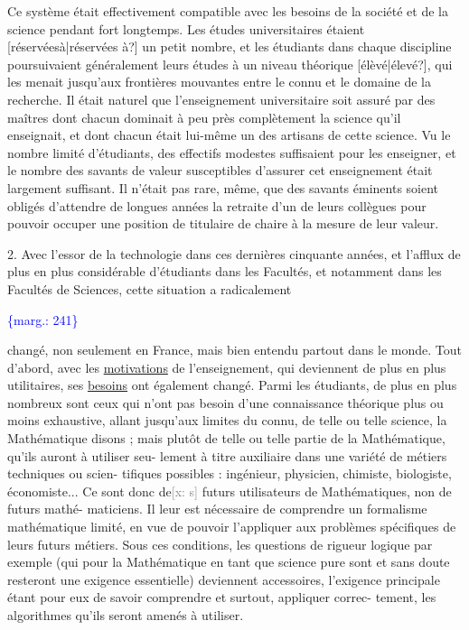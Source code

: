 \documentclass[11pt]{article}
\newcommand{\scanpage}[1]{\par\bigskip\noindent{\small\sffamily[scan #1]}\par}
\newcommand{\mspage}[1]{{\small\sffamily[p.\,#1]}}
\newcommand{\margin}[1]{\textcolor{blue}{\{\textsf{marg.:} #1\}}}
\newcommand{\xout}[1]{\textcolor{gray}{[\textsf{x:} #1]}}
\newcommand{\uline}[1]{\underline{#1}}
\newcommand{\unsure}[1]{[#1?]}
\begin{document}
Ce système était effectivement compatible avec les besoins de la
société et de la science pendant fort longtemps. Les études universitaires
étaient \unsure{réservéesà|réservées à} un petit nombre, et les étudiants dans chaque discipline
poursuivaient généralement leurs études à un niveau théorique \unsure{élèvé|élevé}, qui
les menait jusqu'aux frontières mouvantes entre le connu et le domaine de
la recherche. Il était naturel que l'enseignement universitaire soit assuré
par des maîtres dont chacun dominait à peu près complètement la science qu'il
enseignait, et dont chacun était lui-même un des artisans de cette science.
Vu le nombre limité d'étudiants, des effectifs modestes suffisaient pour
les enseigner, et le nombre des savants de valeur susceptibles d'assurer
cet enseignement était largement suffisant. Il n'était pas rare, même, que
des savants éminents soient obligés d'attendre de longues années la retraite
d'un de leurs collègues pour pouvoir occuper une position de titulaire de
chaire à la mesure de leur valeur.

2. Avec l'essor de la technologie dans ces dernières cinquante années, et
l'afflux de plus en plus considérable d'étudiants dans les Facultés, et
notamment dans les Facultés de Sciences, cette situation a radicalement

\margin{241}

\clearpage
\scanpage{119/242}
\mspage{2}

changé, non seulement en France, mais bien entendu partout dans le monde.
Tout d'abord, avec les \uline{motivations} de l'enseignement, qui deviennent de
plus en plus utilitaires, ses \uline{besoins} ont également changé. Parmi les
étudiants, de plus en plus nombreux sont ceux qui n'ont pas besoin d'une
connaissance théorique plus ou moins exhaustive, allant jusqu'aux limites
du connu, de telle ou telle science, la Mathématique disons ; mais plutôt
de telle ou telle partie de la Mathématique, qu'ils auront à utiliser seu-%
lement à titre auxiliaire dans une variété de métiers techniques ou scien-%
tifiques possibles : ingénieur, physicien, chimiste, biologiste, économiste...
Ce sont donc de\xout{s} futurs utilisateurs de Mathématiques, non de futurs mathé-%
maticiens. Il leur est nécessaire de comprendre un formalisme mathématique
limité, en vue de pouvoir l'appliquer aux problèmes spécifiques de leurs
futurs métiers. Sous ces conditions, les questions de rigueur logique par
exemple (qui pour la Mathématique en tant que science pure sont et sans
doute resteront une exigence essentielle) deviennent accessoires, l'exigence
principale étant pour eux de savoir comprendre et surtout, appliquer correc-%
tement, les algorithmes qu'ils seront amenés à utiliser.
\end{document}
